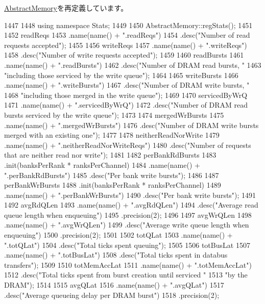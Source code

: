 \hyperlink{classAbstractMemory_a4dc637449366fcdfc4e764cdf12d9b11}{AbstractMemory}を再定義しています。


\begin{DoxyCode}
1447 {
1448     using namespace Stats;
1449 
1450     AbstractMemory::regStats();
1451 
1452     readReqs
1453         .name(name() + ".readReqs")
1454         .desc("Number of read requests accepted");
1455 
1456     writeReqs
1457         .name(name() + ".writeReqs")
1458         .desc("Number of write requests accepted");
1459 
1460     readBursts
1461         .name(name() + ".readBursts")
1462         .desc("Number of DRAM read bursts, "
1463               "including those serviced by the write queue");
1464 
1465     writeBursts
1466         .name(name() + ".writeBursts")
1467         .desc("Number of DRAM write bursts, "
1468               "including those merged in the write queue");
1469 
1470     servicedByWrQ
1471         .name(name() + ".servicedByWrQ")
1472         .desc("Number of DRAM read bursts serviced by the write queue");
1473 
1474     mergedWrBursts
1475         .name(name() + ".mergedWrBursts")
1476         .desc("Number of DRAM write bursts merged with an existing one");
1477 
1478     neitherReadNorWrite
1479         .name(name() + ".neitherReadNorWriteReqs")
1480         .desc("Number of requests that are neither read nor write");
1481 
1482     perBankRdBursts
1483         .init(banksPerRank * ranksPerChannel)
1484         .name(name() + ".perBankRdBursts")
1485         .desc("Per bank write bursts");
1486 
1487     perBankWrBursts
1488         .init(banksPerRank * ranksPerChannel)
1489         .name(name() + ".perBankWrBursts")
1490         .desc("Per bank write bursts");
1491 
1492     avgRdQLen
1493         .name(name() + ".avgRdQLen")
1494         .desc("Average read queue length when enqueuing")
1495         .precision(2);
1496 
1497     avgWrQLen
1498         .name(name() + ".avgWrQLen")
1499         .desc("Average write queue length when enqueuing")
1500         .precision(2);
1501 
1502     totQLat
1503         .name(name() + ".totQLat")
1504         .desc("Total ticks spent queuing");
1505 
1506     totBusLat
1507         .name(name() + ".totBusLat")
1508         .desc("Total ticks spent in databus transfers");
1509 
1510     totMemAccLat
1511         .name(name() + ".totMemAccLat")
1512         .desc("Total ticks spent from burst creation until serviced "
1513               "by the DRAM");
1514 
1515     avgQLat
1516         .name(name() + ".avgQLat")
1517         .desc("Average queueing delay per DRAM burst")
1518         .precision(2);
}
\end{DoxyCode}
